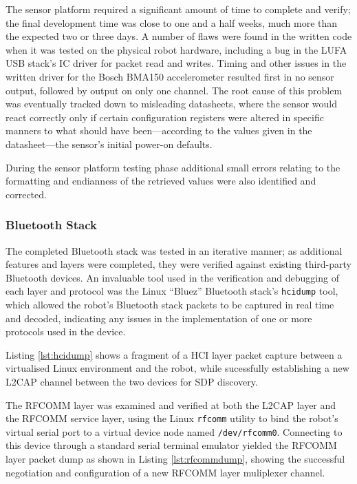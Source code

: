 The sensor platform required a significant amount of time to complete and verify; the final development time was close to one and a half weeks, much more than the expected two or three days. A number of flaws were found in the written code when it was tested on the physical robot hardware, including a bug in the LUFA USB stack's IC driver for packet read and writes. Timing and other issues in the written driver for the Bosch BMA150 accelerometer resulted first in no sensor output, followed by output on only one channel. The root cause of this problem was eventually tracked down to misleading datasheets, where the sensor would react correctly only if certain configuration registers were altered in specific manners to what should have been---according to the values given in the datasheet---the sensor's initial power-on defaults.

During the sensor platform testing phase additional small errors relating to the formatting and endianness of the retrieved values were also identified and corrected.

\FloatBarrier
\subsubsection{Bluetooth Stack}

The completed Bluetooth stack was tested in an iterative manner; as additional features and layers were completed, they were verified against existing third-party Bluetooth devices. An invaluable tool used in the verification and debugging of each layer and protocol was the Linux ``Bluez'' Bluetooth stack's \texttt{hcidump} tool, which allowed the robot's Bluetooth stack packets to be captured in real time and decoded, indicating any issues in the implementation of one or more protocols used in the device.

Listing \ref{lst:hcidump} shows a fragment of a HCI layer packet capture between a virtualised Linux environment and the robot, while sucessfully establishing a new L2CAP channel between the two devices for SDP discovery.



The RFCOMM layer was examined and verified at both the L2CAP layer and the RFCOMM service layer, using the Linux \texttt{rfcomm} utility to bind the robot's virtual serial port to a virtual device node named \texttt{/dev/rfcomm0}. Connecting to this device through a standard serial terminal emulator yielded the RFCOMM layer packet dump as shown in Listing \ref{lst:rfcommdump}, showing the successful negotiation and configuration of a new RFCOMM layer muliplexer channel.

